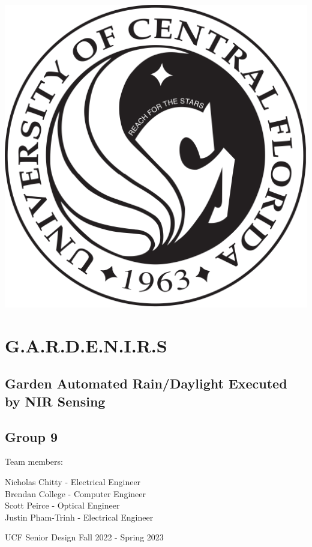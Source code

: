 \begin{titlepage}
    \begin{center}
        \includegraphics[width=.8\textwidth]{images/UCF-crest.png}
        \section*{G.A.R.D.E.N.I.R.S}
        \subsection*{Garden Automated Rain/Daylight Executed by NIR Sensing}
        \subsection*{Group 9}
        \begin{Large}
            Team members:\\
            \vspace{.5cm}
        \end{Large}
        \begin{large}
            Nicholas Chitty - Electrical Engineer\\
            Brendan College - Computer Engineer\\
            Scott Peirce - Optical Engineer\\
            Justin Pham-Trinh - Electrical Engineer \\
        \end{large}
        \vfill
        UCF Senior Design Fall 2022 - Spring 2023

        \pagebreak
    \end{center}
\end{titlepage}